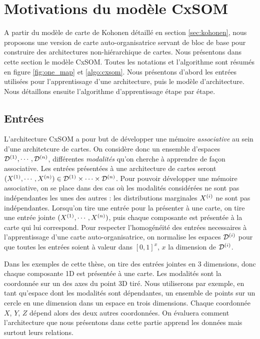 \section{Motivations du modèle CxSOM}
A partir du modèle de carte de Kohonen détaillé en section \ref{sec:kohonen}, nous proposons une version de carte auto-organisatrice servant de bloc de base pour construire des architectures non-hiérarchique de cartes. Nous présentons dans cette section le modèle CxSOM. Toutes les notations et l'algorithme sont résumés en figure \ref{fig:one_map} et \ref{algo:cxsom}. Nous présentons d'abord les entrées utilisées pour l'apprentissage d'une architecture, puis le modèle d'architecture. Nous détaillons ensuite l'algorithme d'apprentissage étape par étape. 

\subsection{Entrées}
L'architecture CxSOM a pour but de développer une mémoire \emph{associative} au sein d'une architetcure de cartes. On considère donc un ensemble d'espaces $\mathcal{D}^{({1})}, \cdots , \mathcal{D}^{({n})}$, différentes \emph{modalités} qu'on cherche à apprendre de façon associative. Les entrées présentées à une architecture de cartes seront $(X^{({1})}, \cdots, X^{({n})}) \in \mathcal{D}^{({1})} \times \cdots \times \mathcal{D}^{({n})}$. Pour pouvoir développer une mémoire associative, on se place dans des cas où les modalités considérées ne sont pas indépendantes les unes des autres : les distributions marginales $X^{({i})}$ ne sont pas indépendantes. Lorsqu'on tire une entrée pour la présenter à une carte, on tire une entrée jointe $(X^{({1})}, \cdots , X^{({n})})$, puis chaque composante est présentée à la carte qui lui correspond. Pour respecter l'homogénéité des entrées necessaires à l'apprentissage d'une carte auto-organisatrice, on normalise les espaces $\mathcal{D}^{({i})}$ pour que toutes les entrées soient à valeur dans $[0,1]^x$, $x$ la dimension de $\mathcal{D}^{({i})}$.

Dans les exemples de cette thèse, on tire des entrées jointes en 3 dimensions, donc chaque composante 1D est présentée à une carte. Les modalités sont la coordonnée sur un des axes du point 3D tiré. Nous utiliserons par exemple, en tant qu'espace dont les modalités sont dépendantes, un ensemble de points sur un cercle en une dimension dans un espace en trois dimensions. Chaque coordonnée $X$, $Y$, $Z$ dépend alors des deux autres coordonnées. On évaluera comment l'architecture que nous présentons dans cette partie apprend les données mais surtout leurs relations. 

